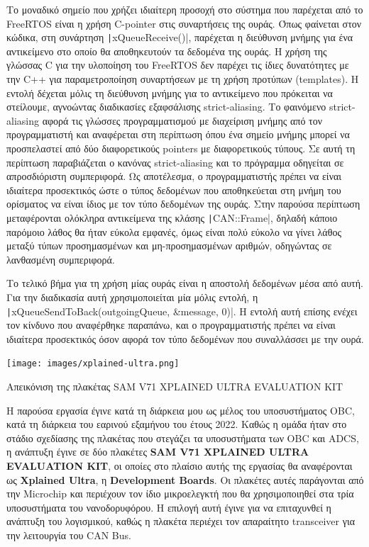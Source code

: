 \documentclass[a4paper,nobib,justified]{tufte-book}
\begin{document}
Το μοναδικό σημείο που χρήζει ιδιαίτερη προσοχή στο σύστημα που παρέχεται από το FreeRTOS είναι η χρήση C-pointer στις συναρτήσεις της ουράς. Όπως φαίνεται στον κώδικα, στη συνάρτηση \texttt|xQueueReceive()|, παρέχεται η διεύθυνση μνήμης για ένα αντικείμενο στο οποίο θα αποθηκευτούν τα δεδομένα της ουράς. Η χρήση της γλώσσας C για την υλοποίηση του FreeRTOS δεν παρέχει τις ίδιες δυνατότητες με την C++ για παραμετροποίηση συναρτήσεων με τη χρήση προτύπων (templates). Η εντολή δέχεται μόλις τη διεύθυνση μνήμης για το αντικείμενο που πρόκειται να στείλουμε, αγνοώντας διαδικασίες εξαφσάλισης strict-aliasing. Το φαινόμενο strict-aliasing αφορά τις γλώσσες προγραμματισμού με διαχείριση μνήμης από τον προγραμματιστή και αναφέρεται στη περίπτωση όπου ένα σημείο μνήμης μπορεί να προσπελαστεί από δύο διαφορετικούς pointers με διαφορετικούς τύπους. Σε αυτή τη περίπτωση παραβιάζεται ο κανόνας strict-aliasing και το πρόγραμμα οδηγείται σε απροσδιόριστη συμπεριφορά. Ως αποτέλεσμα, ο προγραμματιστής πρέπει να είναι ιδιαίτερα προσεκτικός ώστε ο τύπος δεδομένων που αποθηκεύεται στη μνήμη του ορίσματος να είναι ίδιος με τον τύπο δεδομένων της ουράς. Στην παρούσα περίπτωση μεταφέρονται ολόκληρα αντικείμενα της κλάσης \texttt|CAN::Frame|, δηλαδή κάποιο παρόμοιο λάθος θα ήταν εύκολα εμφανές, όμως είναι πολύ εύκολο να γίνει λάθος μεταξύ τύπων προσημασμένων και μη-προσημασμένων αριθμών, οδηγώντας σε λανθασμένη συμπεριφορά.

Το τελικό βήμα για τη χρήση μίας ουράς είναι η αποστολή δεδομένων μέσα από αυτή. Για την διαδικασία αυτή χρησιμοποιείται μία μόλις εντολή, η \texttt|xQueueSendToBack(outgoingQueue, &message, 0)|. Η εντολή αυτή επίσης ενέχει τον κίνδυνο που αναφέρθηκε παραπάνω, και ο προγραμματιστής πρέπει να είναι ιδιαίτερα προσεκτικός όσον αφορά τον τύπο δεδομένων που συναλλάσσει με την ουρά. 

\begin{marginfigure}
	\centering
	\texttt{[image: images/xplained-ultra.png]}
	\label{fig:xplained-ultra}
	\caption[Απεικόνιση της πλακέτας SAM V71 XPLAINED ULTRA EVALUATION KIT]{Απεικόνιση της πλακέτας SAM V71 XPLAINED ULTRA EVALUATION KIT}
\end{marginfigure}
Η παρούσα εργασία έγινε κατά τη διάρκεια μου ως μέλος του υποσυστήματος OBC, κατά τη διάρκεια του εαρινού εξαμήνου του έτους 2022. Καθώς η ομάδα ήταν στο στάδιο σχεδίασης της πλακέτας που στεγάζει τα υποσυστήματα των OBC και ADCS, η ανάπτυξη έγινε σε δύο πλακέτες \textbf{SAM V71 XPLAINED ULTRA EVALUATION KIT}, οι οποίες στο πλαίσιο αυτής της εργασίας θα αναφέρονται ως \textbf{Xplained Ultra}, η \textbf{Development Boards}. Οι πλακέτες αυτές παράγονται από την Microchip και περιέχουν τον ίδιο μικροελεγκτή που θα χρησιμοποιηθεί στα τρία υποσυστήματα του νανοδορυφόρου. Η επιλογή αυτή έγινε για να επιταχυνθεί η ανάπτυξη του λογισμικού, καθώς η πλακέτα περιέχει τον απαραίτητο transceiver για την λειτουργία του CAN Bus. 
\end{document}

